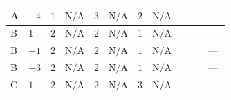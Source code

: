 \documentclass[8pt]{article}
\begin{document}
\begin{landscape}
\begin{longtable}{@{}llcccccc >{\raggedright\arraybackslash}p{0.21\linewidth} >{\raggedright\arraybackslash}p{0.21\linewidth} >{\raggedright\arraybackslash}p{0.21\linewidth}@{}}
\midrule
A & $-4$ & $1$ & $\text{N/A}$ & $3$ & $\text{N/A}$ & $2$ & $\text{N/A}$ & \scriptsize\adjustbox{max width=\linewidth}{$\begin{gathered} +4 {\lambda_{HS_2}^{(1)}}^2\end{gathered}$} & \scriptsize\adjustbox{max width=\linewidth}{$\begin{gathered} +14 {\lambda_{S_2}^{(1)}}^2\end{gathered}$} & \scriptsize\adjustbox{max width=\linewidth}{$\begin{gathered} +8 {\lambda_{S_2}^{(1)}} {\lambda_{S_2}^{(A)}}\end{gathered}$} \\
\midrule
B & $1$ & $2$ & $\text{N/A}$ & $2$ & $\text{N/A}$ & $1$ & $\text{N/A}$ & \scriptsize\adjustbox{max width=\linewidth}{$\begin{gathered} +4 {\lambda_{HS_2}^{(1)}}^2\end{gathered}$} & \scriptsize\adjustbox{max width=\linewidth}{$\begin{gathered} +12 {\lambda_{S_2}^{(1)}}^2\end{gathered}$} & --- \\
\midrule
B & $-1$ & $2$ & $\text{N/A}$ & $2$ & $\text{N/A}$ & $1$ & $\text{N/A}$ & \scriptsize\adjustbox{max width=\linewidth}{$\begin{gathered} +4 {\lambda_{HS_2}^{(1)}}^2\end{gathered}$} & \scriptsize\adjustbox{max width=\linewidth}{$\begin{gathered} +12 {\lambda_{S_2}^{(1)}}^2\end{gathered}$} & --- \\
\midrule
B & $-3$ & $2$ & $\text{N/A}$ & $2$ & $\text{N/A}$ & $1$ & $\text{N/A}$ & \scriptsize\adjustbox{max width=\linewidth}{$\begin{gathered} +4 {\lambda_{HS_2}^{(1)}}^2\end{gathered}$} & \scriptsize\adjustbox{max width=\linewidth}{$\begin{gathered} +12 {\lambda_{S_2}^{(1)}}^2\end{gathered}$} & --- \\
\midrule
C & $1$ & $2$ & $\text{N/A}$ & $2$ & $\text{N/A}$ & $3$ & $\text{N/A}$ & \scriptsize\adjustbox{max width=\linewidth}{$\begin{gathered} +4 {\lambda_{HS_2}^{(1)}}^2\end{gathered}$} & \scriptsize\adjustbox{max width=\linewidth}{$\begin{gathered} +12 {\lambda_{S_2}^{(1)}}^2\end{gathered}$} & --- \\

\end{longtable}
\end{landscape}
\end{document}
